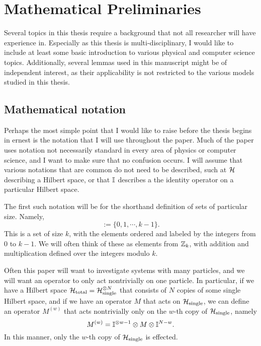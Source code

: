 \documentclass[../thesis-main/thesis-main]{subfiles}
\begin{document}
\chapter{Mathematical Preliminaries}
\label{chap:mathematical_preliminaries}


Several topics in this thesis require a background that not all researcher will have experience in.  Especially as this thesis is multi-disciplinary, I would like to include at least some basic introduction to various physical and computer science topics.  Additionally, several lemmas used in this manuscript might be of independent interest, as their applicability is not restricted to the various models studied in this thesis. 

\section{Mathematical notation}
\label{sec:mathematical_notation}

Perhaps the most simple point that I would like to raise before the thesis begins in ernest is the notation that I will use throughout the paper.  Much of the paper uses notation not necessarily standard in every area of physics or computer science, and I want to make sure that no confusion occurs.  I will assume that various notations that are common do not need to be described, such at $\mathcal{H}$ describing a Hilbert space, or that $\mathbb{I}$ describes a the identity operator on a particular Hilbert space.

The first such notation will be for the shorthand definition of sets of particular size.  Namely,
\begin{equation}
[k] := \{0,1,\cdots, k-1\}.
\end{equation}
This is a set of size $k$, with the elements ordered and labeled by the integers from $0$ to $k-1$.  We will often think of these as elements from $\mathbb{Z}_{k}$, with addition and multiplication defined over the integers modulo $k$.

Often this paper will want to investigate systems with many particles, and we will want an operator to only act nontrivially on one particle.  In particular, if we have a Hilbert space $\mathcal{H}_{\text{total}} = \mathcal{H}_{\text{single}}^{\otimes N}$ that consists of $N$ copies of some single Hilbert space, and if we have an operator $M$ that acts on $\mathcal{H}_{\text{single}}$, we can define an operator $M^{(w)}$ that acts nontrivially only on the $w$-th copy of $\mathcal{H}_{\text{single}}$, namely
\begin{equation}
  M^{(w)} = \mathbb{I}^{\otimes w-1} \otimes M \otimes \mathbb{I}^{N- w}.
\end{equation}
In this manner, only the $w$-th copy of $\mathcal{H}_{\text{single}}$ is effected.
\end{document}
